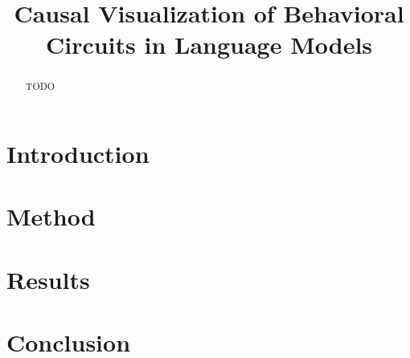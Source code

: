 \documentclass{article}
\title{Causal Visualization of Behavioral Circuits in Language Models}
\author{}
\date{}
\begin{document}
\maketitle

\begin{abstract}
TODO
\end{abstract}

\section{Introduction}

\section{Method}

\section{Results}

\section{Conclusion}



\end{document}

